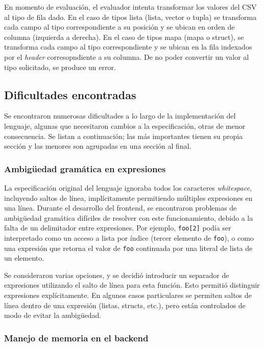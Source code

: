 En momento de evaluación, el evaluador intenta transformar los valores del CSV al tipo de fila dado. En el caso de tipos lista (lista, vector o tupla) se transforma cada campo al tipo correspondiente a su posición y se ubican en orden de columna (izquierda a derecha). En el caso de tipos mapa (mapa o struct), se transforma cada campo al tipo correspondiente y se ubican en la fila indexados por el \textit{header} corresopndiente a su columna. De no poder convertir un valor al tipo solicitado, se produce un error.

\subsection{Dificultades encontradas}

Se encontraron numerosas dificultades a lo largo de la implementación del lenguaje, algunas que necesitaron cambios a la especificación, otras de menor consecuencia. Se listan a continuación; las más importantes tienen su propia sección y las menores son agrupadas en una sección al final.

\subsubsection{Ambigüedad gramática en expresiones}

La especificación original del lenguaje ignoraba todos los caracteres \textit{whitespace}, incluyendo saltos de línea, implícitamente permitiendo múltiples expresiones en una línea. Durante el desarrollo del frontend, se encontraron problemas de ambigüedad gramática difíciles de resolver con este funcionamiento, debido a la falta de un delimitador entre expresiones. Por ejemplo, \texttt{foo[2]} podía ser interpretado como un acceso a lista por índice (tercer elemento de \texttt{foo}), o como una expresión que retorna el valor de \texttt{foo} continuada por una literal de lista de un elemento.

Se consideraron varias opciones, y se decidió introducir un separador de expresiones utilizando el salto de línea para esta función. Esto permitió distinguir expresiones explícitamente. En algunos casos particulares se permiten saltos de línea dentro de una expresión (listas, structs, etc.), pero están controlados de modo de evitar la ambigüedad.

\subsubsection{Manejo de memoria en el backend}

